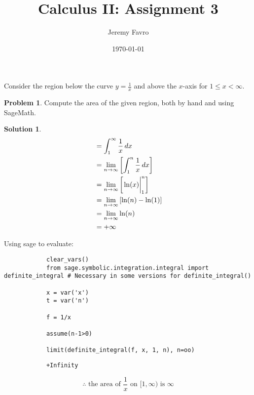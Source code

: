 \documentclass[10pt]{article}
\title{Calculus II: Assignment 3}
\author{Jeremy Favro}
\date{\today}
\makeatletter
\theoremstyle{definition}
\newtheorem{problem}{Problem}
\newtheorem{soln}{Solution}
\newcommand{\boxspacing}{\kern\kvtcb@left@rule\kern\kvtcb@boxsep}
\newcommand{\prompt}[4]{
    \ttfamily\llap{{\color{#2}[#3]:\hspace{3pt}#4}}\vspace{-\baselineskip}
}
\makeatother
\begin{document}
\maketitle

\noindent Consider the region below the curve $y = \frac{1}{x}$ and above the $x$-axis for $1 \leq x < \infty$.

\begin{problem}
Compute the area of the given region, both by hand and using SageMath.
\end{problem}
\begin{soln}
    \begin{align*}
         & = \int_{1}^{\infty} \frac{1}{x} \,dx                               \\
         & = \lim_{n \to \infty}  \left[\int_{1}^{n} \frac{1}{x} \,dx \right] \\
         & = \lim_{n \to \infty}  \left[\evaluated{\ln(x)}_{1}^{n}\right]     \\
         & = \lim_{n \to \infty}  \left[\ln(n)-\ln(1)\right]                  \\
         & = \lim_{n \to \infty}  \ln(n)                                      \\
         & = +\infty                                                          \\
    \end{align*}

    \noindent Using sage to evaluate:
    \begin{tcolorbox}[breakable, size=fbox, boxrule=1pt, pad at break*=1mm,colback=cellbackground, colframe=cellborder]
        \prompt{In}{incolor}{1}{\boxspacing}
        \begin{verbatim}
            clear_vars()
            from sage.symbolic.integration.integral import definite_integral # Necessary in some versions for definite_integral()
            
            x = var('x')
            t = var('n')
            
            f = 1/x
            
            assume(n-1>0)
            
            limit(definite_integral(f, x, 1, n), n=oo)
        \end{verbatim}
    \end{tcolorbox}
    \begin{tcolorbox}[breakable, size=fbox, boxrule=.5pt, pad at break*=1mm, opacityfill=0]
        \prompt{Out}{outcolor}{1}{\boxspacing}
        \begin{verbatim}
            +Infinity
        \end{verbatim}
    \end{tcolorbox}



    $$\therefore \text{ the area of } \frac{1}{x} \text{ on } [1,\infty) \text{ is } \infty$$
\end{soln}
\end{document}
